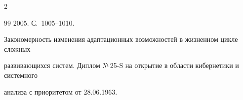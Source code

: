 \begin{multicols}{2}
{{\begin{thebibliography}{99}
2005. С.~1005--1010.









Закономерность изменения адаптационных возможностей в жизненном цикле сложных 


развивающихся систем. Диплом №\,25-S на открытие в области кибернетики и системного 


анализа с приоритетом от 28.06.1963.



























































\end{thebibliography}}}
\end{multicols}
